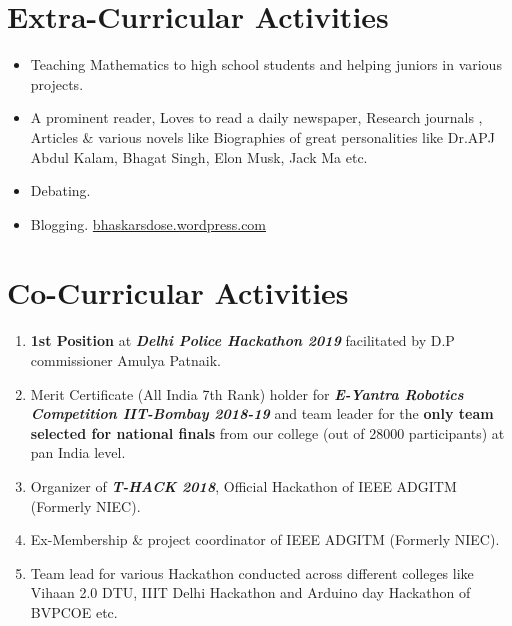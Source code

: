 \documentclass[10pt]{report}
\begin{document}
\section*{\color{BlueViolet}\faPencil\hspace{1pt} Extra-Curricular Activities} %
\begin{itemize}
	\item Teaching Mathematics to high school students and helping juniors in various projects.
	\item A prominent reader, Loves to read a daily newspaper, Research journals , Articles \& various novels like Biographies of great personalities like Dr.APJ Abdul Kalam, Bhagat Singh, Elon Musk, Jack Ma etc.
	\item Debating.
    \item Blogging. \faExternalLink \url{bhaskarsdose.wordpress.com}
\end{itemize}

\section*{\color{BlueViolet}\faTrophy\hspace{1pt} Co-Curricular Activities}%
\begin{enumerate}
	\item \textbf{1st Position} at \textbf{\emph{Delhi Police Hackathon 2019}}  facilitated by D.P commissioner Amulya Patnaik.
	\item Merit Certificate (All India 7th Rank) holder for \textbf{\emph{E-Yantra Robotics Competition IIT-Bombay 2018-19}} and team leader for the \textbf{only team selected for national finals} from our college (out of 28000 participants) at pan India level.
	\item Organizer of \textbf{\emph{T-HACK 2018}}, Official Hackathon of IEEE ADGITM (Formerly NIEC).
	\item Ex-Membership \& project coordinator of IEEE ADGITM (Formerly NIEC).
	\item Team lead for various Hackathon conducted across different colleges like Vihaan 2.0 DTU, IIIT Delhi Hackathon and Arduino day Hackathon of BVPCOE etc.
\end{enumerate}

\end{document}
